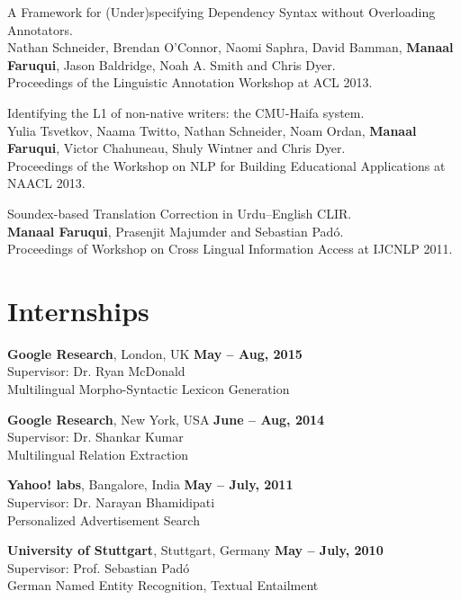 \documentclass[margin,line]{res}
\begin{document}
\begin{resume}
A Framework for (Under)specifying Dependency Syntax without Overloading Annotators.\\
Nathan Schneider, Brendan O'Connor, Naomi Saphra, David Bamman, \textbf{Manaal Faruqui}, Jason Baldridge, Noah A. Smith and Chris Dyer.\\
Proceedings of the Linguistic Annotation Workshop at ACL 2013.

Identifying the L1 of non-native writers: the CMU-Haifa system.\\
Yulia Tsvetkov, Naama Twitto, Nathan Schneider, Noam Ordan, \textbf{Manaal Faruqui}, Victor Chahuneau, Shuly Wintner and Chris Dyer.\\
Proceedings of the Workshop on NLP for Building Educational Applications at NAACL 2013.

Soundex-based Translation Correction in Urdu--English CLIR.\\
\textbf{Manaal Faruqui}, Prasenjit Majumder and Sebastian Pad\'{o}.\\
Proceedings of Workshop on Cross Lingual Information Access at IJCNLP 2011.

\section{\sc Internships}

{\bf Google Research}, London, UK \hfill {\bf May -- Aug, 2015}\\
Supervisor: Dr. Ryan McDonald \\
Multilingual Morpho-Syntactic Lexicon Generation

{\bf Google Research}, New York, USA \hfill {\bf June -- Aug, 2014}\\
Supervisor: Dr. Shankar Kumar \\
Multilingual Relation Extraction

{\bf Yahoo! labs}, Bangalore, India \hfill {\bf May -- July, 2011}\\
Supervisor: Dr. Narayan Bhamidipati\\
Personalized Advertisement Search

{\bf University of Stuttgart}, Stuttgart, Germany \hfill {\bf May -- July, 2010}\\
Supervisor: Prof. Sebastian Pad\'{o} \\
German Named Entity Recognition, Textual Entailment


\end{resume}
\end{document}
